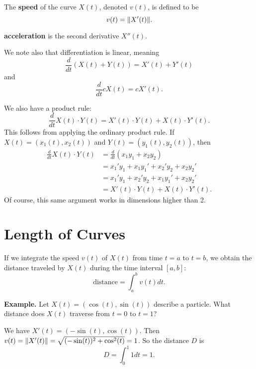 \documentclass{article}
\begin{document}
The \textbf{speed} of the curve $X(t)$, denoted $v(t)$, is defined to be 
\[v(t) = \norm{X'(t)}.\]

\textbf{acceleration} is the second derivative $X''(t)$.

We note also that differentiation is linear, meaning
\[\frac{d}{dt} \left( X(t) + Y(t) \right) = X'(t) + Y'(t)\]
and 
\[\frac{d}{dt} cX(t) = cX'(t).\]

We also have a product rule:
\[\frac{d}{dt} X(t) \cdot Y(t) = X'(t)\cdot Y(t) + X(t) \cdot Y'(t).\]
This follows from applying the ordinary product rule. If $X(t) = (x_1(t), x_2(t))$ and
$Y(t) = (y_1(t), y_2(t))$, then
\begin{align*}
    \frac{d}{dt} X(t) \cdot Y(t) &= \frac{d}{dt} (x_1y_1 + x_2y_2)\\
    &= x_1'y_1 + x_1y_1' + x_2'y_2 + x_2y_2'\\
    &= x_1'y_1 + x_2'y_2 + x_1y_1' + x_2y_2'\\
    &= X'(t)\cdot Y(t) + X(t) \cdot Y'(t).
\end{align*}
Of course, this same argument works in dimensions higher than 2.
\section*{Length of Curves}
If we integrate the speed $v(t)$ of $X(t)$ from time $t=a$ to $t=b$,
we obtain the distance traveled by $X(t)$ during the time interval $[a,b]$:
\[\text{distance} = \int_a^b v(t)dt.\]

\textbf{Example.} Let $X(t) = (\cos(t), \sin(t))$ describe a particle.
What distance does $X(t)$ traverse from $t=0$ to $t=1$?

We have $X'(t)=(-\sin(t), \cos(t))$. Then $v(t) = \norm{X'(t)} 
= \sqrt{(-\sin(t))^2 + \cos^2(t)} = 1$. So the distance $D$ is 
\[D = \int_0^1 1 dt = 1.\]
\end{document}
